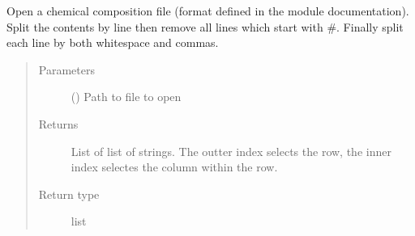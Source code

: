 \documentclass[letterpaper,10pt,english]{sphinxmanual}
\begin{document}
\begin{fulllineitems}
\label{\detokenize{pyTOPSScrape.parse:pyTOPSScrape.parse.abundance.open_chm_file}}
\sphinxAtStartPar
Open a chemical composition file (format defined in the module
documentation). Split the contents by line then remove all lines which
start with \#. Finally split each line by both whitespace and commas.
\begin{quote}\begin{description}
\item[{Parameters}] \leavevmode
\sphinxAtStartPar
{} () \textendash{} Path to file to open

\item[{Returns}] \leavevmode
\sphinxAtStartPar
{} \textendash{} List of list of strings. The outter index selects the row, the
inner index selectes the column within the row.

\item[{Return type}] \leavevmode
\sphinxAtStartPar
list

\end{description}\end{quote}

\end{fulllineitems}

\end{document}
